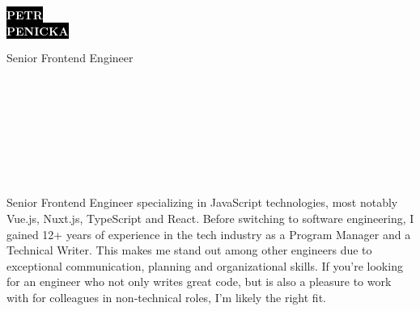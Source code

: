 \documentclass[9pt]{developercv}
\begin{document}
\begin{minipage}[t]{0.41\textwidth}
  \vspace{-\baselineskip}

  \colorbox{black}{{\HUGE\textcolor{white}{\textbf{\MakeUppercase{Petr}}}}}
  \\
  \colorbox{black}{{\HUGE\textcolor{white}{\textbf{\MakeUppercase{Penicka}}}}}

  \vspace{6pt}

  {\huge Senior Frontend Engineer}
\end{minipage}
\begin{minipage}[t]{0.275\textwidth}
  \vspace{-\baselineskip}

  \\
  \\
  \\
\end{minipage}
\begin{minipage}[t]{0.34\textwidth}
  \vspace{-\baselineskip}

  \\
  \\
  \\
\end{minipage}

\vspace{0.5cm}


\begin{minipage}[t]{1\textwidth}
  \vspace{-\baselineskip}

  {Senior Frontend Engineer specializing in JavaScript technologies, most notably Vue.js, Nuxt.js, TypeScript and React. Before switching to software engineering, I gained 12+ years of experience in the tech industry as a Program Manager and a Technical Writer. This makes me stand out among other engineers due to exceptional communication, planning and organizational skills. If you're looking for an engineer who not only writes great code, but is also a pleasure to work with for colleagues in non-technical roles, I'm likely the right fit.}\\
\end{minipage}
\end{document}
